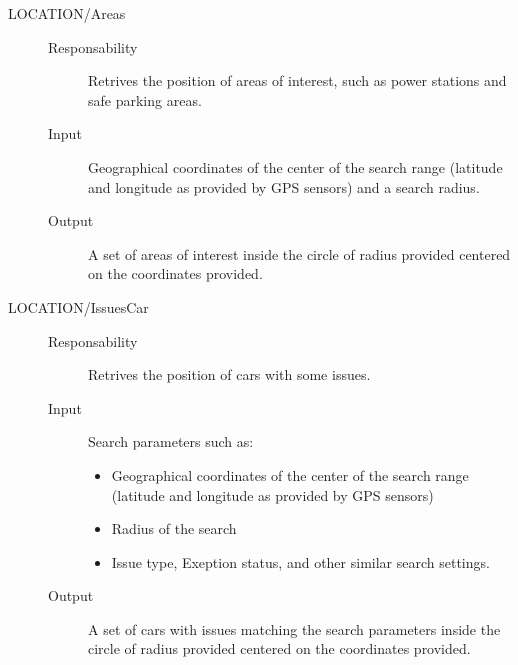\documentclass[11pt]{article} %
\begin{document}
\begin{description}
\begin{description}
	\item[LOCATION/Areas] \hfill
		\begin{description} 
			\item[Responsability] Retrives the position of areas of interest, such as power stations and safe parking areas.
			\item[Input] Geographical coordinates of the center of the search range (latitude and longitude as provided by GPS sensors) and a search radius.
			\item[Output] A set of areas of interest inside the circle of radius provided centered on the coordinates provided.
		\end{description}

	\item[LOCATION/IssuesCar] \hfill
		\begin{description}
			\item[Responsability] Retrives the position of cars with some issues.
			\item[Input] Search parameters such as:
			\begin{itemize}
				\item Geographical coordinates of the center of the search range (latitude and longitude as provided by GPS sensors) 
				\item Radius of the search
				\item Issue type, Exeption status, and other similar search settings.
			\end{itemize}
			\item[Output] A set of cars with issues matching the search parameters inside the circle of radius provided centered on the coordinates provided.
		\end{description}
	\end{description}


\end{description}
\end{document}
